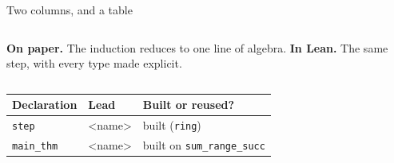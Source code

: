 \documentclass[11pt,aspectratio=169]{beamer}
\newcommand{\lean}[1]{\texttt{#1}}
\begin{document}
\begin{frame}{Two columns, and a table}
  \begin{columns}[t]
      \textbf{On paper.} The induction reduces to one line of algebra.
      \textbf{In Lean.} The same step, with every type made explicit.
  \end{columns}
  \vspace{1em}
  \begin{center}
  \small
  \begin{tabular}{@{}lll@{}}
  \toprule
  \textbf{Declaration} & \textbf{Lead} & \textbf{Built or reused?} \\
  \midrule
  \lean{step}      & <name> & built (\lean{ring}) \\
  \lean{main\_thm} & <name> & built on \lean{sum\_range\_succ} \\
  \bottomrule
  \end{tabular}
  \end{center}
\end{frame}

\begin{frame}{}
  \begin{center}
    {}
  \end{center}
\end{frame}
\end{document}

